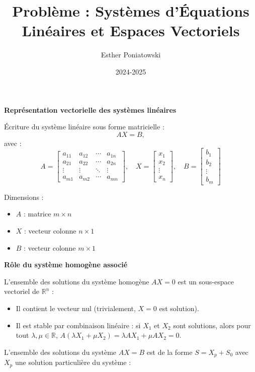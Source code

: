 \documentclass[10pt,a4paper]{article}
\title{Problème : Systèmes d'Équations Linéaires et Espaces Vectoriels}
\author{Esther Poniatowski}
\date{2024-2025}
\begin{document}
\textbf{Représentation vectorielle des systèmes linéaires}

\q Écriture du système linéaire sous forme matricielle :
\[
AX = B,
\]
avec :
\[
A =
\begin{bmatrix}
    a_{11} & a_{12} & \cdots & a_{1n} \\
    a_{21} & a_{22} & \cdots & a_{2n} \\
    \vdots & \vdots & \ddots & \vdots \\
    a_{m1} & a_{m2} & \cdots & a_{mn}
\end{bmatrix},
\quad
X = \begin{bmatrix} x_1 \\ x_2 \\ \vdots \\ x_n \end{bmatrix},
\quad
B = \begin{bmatrix} b_1 \\ b_2 \\ \vdots \\ b_m \end{bmatrix}
\]

Dimensions :

\begin{itemize}
    \item \( A \) : matrice \( m \times n \)
    \item \( X \) : vecteur colonne \( n \times 1 \)
    \item \( B \) : vecteur colonne \( m \times 1 \)
\end{itemize}

\bigskip
\textbf{Rôle du système homogène associé}

\q L'ensemble des solutions du système homogène $AX = 0$ est un sous-espace vectoriel de
$\mathbb{R}^n$ :
\begin{itemize}
    \item Il contient le vecteur nul (trivialement, $X = 0$ est solution).
    \item Il est stable par combinaison linéaire : si $X_1$ et $X_2$ sont solutions, alors pour tout
    $\lambda, \mu \in \mathbb{R}$, $A(\lambda X_1 + \mu X_2) = \lambda AX_1 + \mu AX_2 = 0$.
\end{itemize}

\q L'ensemble des solutions du système $AX = B$ est de la forme $S = X_p + S_0$ avec $X_p$ une
solution particulière du système :
\end{document}
